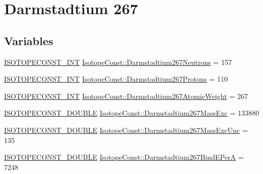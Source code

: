 \hypertarget{group___isotope_const-_darmstadtium-_ds267}{}\section{Darmstadtium 267}
\label{group___isotope_const-_darmstadtium-_ds267}
\subsection*{Variables}
\begin{DoxyCompactItemize}
\item 
\mbox{\hyperlink{group___isotope_const-_macros_ga5f18360b3e99483a35c32d789e62621c}{I\+S\+O\+T\+O\+P\+E\+C\+O\+N\+S\+T\+\_\+\+I\+NT}} \mbox{\hyperlink{group___isotope_const-_darmstadtium-_ds267_ga9a44db44177be91aded51371c7f2b50e}{Isotope\+Const\+::\+Darmstadtium267\+Neutrons}} = 157
\item 
\mbox{\hyperlink{group___isotope_const-_macros_ga5f18360b3e99483a35c32d789e62621c}{I\+S\+O\+T\+O\+P\+E\+C\+O\+N\+S\+T\+\_\+\+I\+NT}} \mbox{\hyperlink{group___isotope_const-_darmstadtium-_ds267_gacb06252fd0f67c15af292f3a11eac812}{Isotope\+Const\+::\+Darmstadtium267\+Protons}} = 110
\item 
\mbox{\hyperlink{group___isotope_const-_macros_ga5f18360b3e99483a35c32d789e62621c}{I\+S\+O\+T\+O\+P\+E\+C\+O\+N\+S\+T\+\_\+\+I\+NT}} \mbox{\hyperlink{group___isotope_const-_darmstadtium-_ds267_ga821b6c66d2d95f5a16cd84d59077cc7f}{Isotope\+Const\+::\+Darmstadtium267\+Atomic\+Weight}} = 267
\item 
\mbox{\hyperlink{group___isotope_const-_macros_ga8f45a7272ce02c0b4c65c44636ed719a}{I\+S\+O\+T\+O\+P\+E\+C\+O\+N\+S\+T\+\_\+\+D\+O\+U\+B\+LE}} \mbox{\hyperlink{group___isotope_const-_darmstadtium-_ds267_ga8fb1448e644cd0052ff5f2d1624b9bdd}{Isotope\+Const\+::\+Darmstadtium267\+Mass\+Exc}} = 133880
\item 
\mbox{\hyperlink{group___isotope_const-_macros_ga8f45a7272ce02c0b4c65c44636ed719a}{I\+S\+O\+T\+O\+P\+E\+C\+O\+N\+S\+T\+\_\+\+D\+O\+U\+B\+LE}} \mbox{\hyperlink{group___isotope_const-_darmstadtium-_ds267_ga793bc1361cc5385386631c85eb27995f}{Isotope\+Const\+::\+Darmstadtium267\+Mass\+Exc\+Unc}} = 135
\item 
\mbox{\hyperlink{group___isotope_const-_macros_ga8f45a7272ce02c0b4c65c44636ed719a}{I\+S\+O\+T\+O\+P\+E\+C\+O\+N\+S\+T\+\_\+\+D\+O\+U\+B\+LE}} \mbox{\hyperlink{group___isotope_const-_darmstadtium-_ds267_gaa74c9f705b35210ea026401bad329aa5}{Isotope\+Const\+::\+Darmstadtium267\+Bind\+E\+PerA}} = 7248

\end{DoxyCompactItemize}
